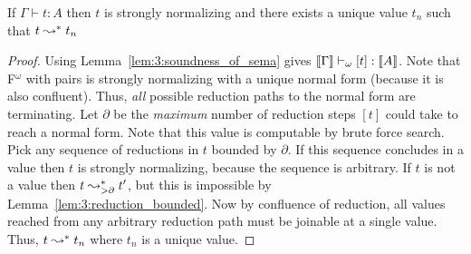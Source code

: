 \begin{theorem}
    \label{lem:3:proof_normalization}
    If $\Gamma \vdash t : A$ then $t$ is strongly normalizing and there exists a unique value $t_n$ such that $t \leadsto^* t_n$
\end{theorem}
\begin{proof}
    Using Lemma~\ref{lem:3:soundness_of_sema} gives $\llbracket \Gamma \rrbracket \vdash_\omega [t] : \llbracket A \rrbracket$.
    Note that F$^\omega$ with pairs is strongly normalizing with a unique normal form (because it is also confluent).
    Thus, \textit{all} possible reduction paths to the normal form are terminating.
    Let $\partial$ be the \textit{maximum} number of reduction steps $[t]$ could take to reach a normal form.
    Note that this value is computable by brute force search.
    Pick any sequence of reductions in $t$ bounded by $\partial$.
    If this sequence concludes in a value then $t$ is strongly normalizing, because the sequence is arbitrary.
    If $t$ is not a value then $t \leadsto^*_{>\partial} t^\prime$, but this is impossible by Lemma~\ref{lem:3:reduction_bounded}.
    Now by confluence of reduction, all values reached from any arbitrary reduction path must be joinable at a single value.
    Thus, $t \leadsto^* t_n$ where $t_n$ is a unique value.
\end{proof}

